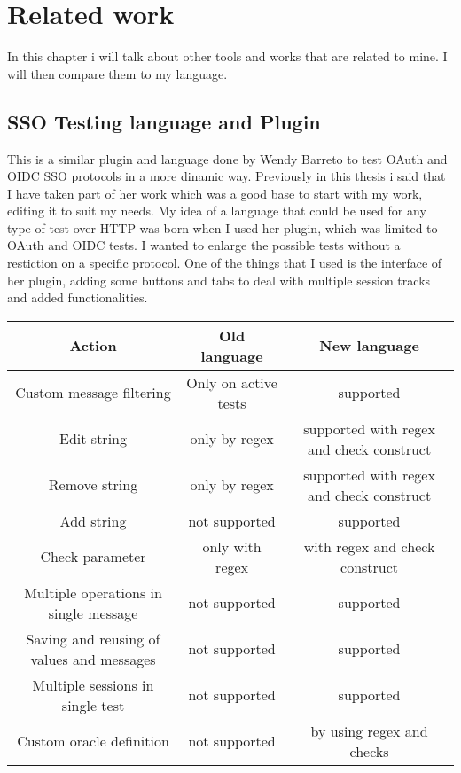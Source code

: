 \chapter{Related work}
In this chapter i will talk about other tools and works that are related to mine. I will then compare them to my language.

\section{SSO Testing language and Plugin}
This is a similar plugin and language done by Wendy Barreto \cite{wendy_barreto} to test OAuth and OIDC SSO protocols in a more dinamic way. Previously in this thesis i said that I have taken part of her work which was a good base to start with my work, editing it to suit my needs. My idea of a language that could be used for any type of test over HTTP was born when I used her plugin, which was limited to OAuth and OIDC tests. I wanted to enlarge the possible tests without a restiction on a specific protocol. One of the things that I used is the interface of her plugin, adding some buttons and tabs to deal with multiple \gls{session track}s and added functionalities.

\begin{center}
    \begin{tabular}{ |c|c|c| }
        \hline
        Action                                    & Old language         & New language                             \\
        \hline\hline
        Custom message filtering                  & Only on active tests & supported                                \\
        Edit string                               & only by regex        & supported with regex and check construct \\
        Remove string                             & only by regex        & supported with regex and check construct \\
        Add string                                & not supported        & supported                                \\
        Check parameter                           & only with regex      & with regex and check construct           \\
        Multiple operations in single message     & not supported        & supported                                \\
        Saving and reusing of values and messages & not supported        & supported                                \\
        Multiple sessions in single test          & not supported        & supported                                \\
        Custom oracle definition                  & not supported        & by using regex and checks                \\
        \hline
    \end{tabular}
\end{center}


